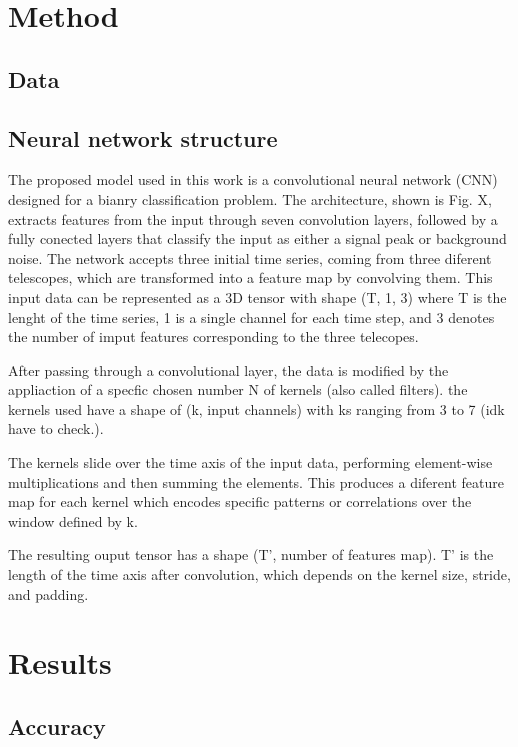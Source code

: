 \documentclass{article}
\begin{document}
\begin{multicols}{2}
\section{Method}
\subsection{Data}

\subsection{Neural network structure}

\indent
The proposed model used in this work is a convolutional neural network (CNN) designed for a bianry classification problem.
The architecture, shown is Fig. X, extracts features from the input through seven convolution layers, 
followed by a fully conected layers that classify the input as either a signal peak or background noise.
The network accepts three initial time series, coming from three diferent telescopes, which are transformed into a feature map by convolving them.
This input data can be represented as a 3D tensor with shape (T, 1, 3) where T is the lenght of the time series,
1 is a single channel for each time step, and 3 denotes the number of imput features corresponding to the three telecopes.

After passing through a convolutional layer, the data is modified by the appliaction of a specfic chosen number N of kernels (also called filters).
the kernels used have a shape of (k, input channels) with ks ranging from 3 to 7 (idk have to check.).

The kernels slide over the time axis of the input data, performing element-wise multiplications and then summing the elements. 
This produces a diferent feature map for each kernel which encodes specific patterns or correlations over the window defined by k.

The resulting ouput tensor has a shape (T', number of features map). T' is the length of the time axis after convolution, 
which depends on the kernel size, stride, and padding.







\section{Results}
\subsection{Accuracy}


\end{multicols}
\end{document}
